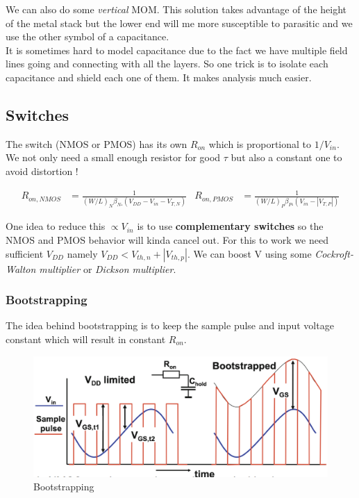 \documentclass{report}
\begin{document}
We can also do some \textit{vertical} MOM. This solution takes advantage of the height of the metal stack but the lower end will me more susceptible to parasitic and we use the other symbol of a capacitance.\\

It is sometimes hard to model capacitance due to the fact we have multiple field lines going and connecting with all the layers. So one trick is to isolate each capacitance and shield each one of them. It makes analysis much easier.

\subsection{Switches}

The switch (NMOS or PMOS) has its own $R_{on}$ which is proportional to $1/V_{in}$. We not only need a small enough resistor for good $\tau$ but also a constant one to avoid distortion !

\begin{align}
R_{o n, N M O S} & =\frac{1}{(W / L)_N \beta_{N \square}\left(V_{D D}-V_{i n}-V_{T, N}\right)} &
R_{o n, P M O S} & =\frac{1}{(W / L)_P \beta_{P \square}\left(V_{i n}-\left|V_{T, P}\right|\right)}
\end{align}

One idea to reduce this $\propto V_{in}$ is to use \textbf{complementary switches} so the NMOS and PMOS behavior will kinda cancel out. For this to work we need sufficient $V_{DD}$ namely $ V_{DD} < V_{th,n} + |V_{th,p}|$. We can boost V using some \textit{Cockroft-Walton multiplier} or \textit{Dickson multiplier}.

\subsubsection{Bootstrapping}

The idea behind bootstrapping is to keep the sample pulse and input voltage constant which will result in constant $R_{on}$.

\begin{figure}[H]
    \centering
    \includegraphics[width=0.5\linewidth]{img/bootstrapping.png}
    \caption{Bootstrapping}
    \label{fig:enter-label}
\end{figure}
\end{document}
